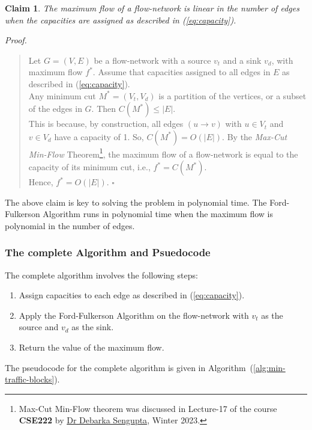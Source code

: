 \documentclass[12pt]{report}
\newtheorem{claim}{Claim}
\begin{document}
    \begin{claim}
        \label{claim:polynomial}
        The maximum flow of a flow-network is linear in the number of edges when
        the capacities are assigned as described in (\ref{eq:capacity}).
    \end{claim}
    \textit{Proof.}
    \begin{quote}
        Let $G = (V, E)$ be a flow-network with a source $v_{t}$ and a sink $v_{d}$, with maximum flow $f^{*}$.
        Assume that capacities assigned to all edges in $E$ as described in (\ref{eq:capacity}).
        \vspace*{10pt} \\
        Any minimum cut $M^{*} = (V_{t}, V_{d})$ is a partition of the vertices, or a subset of the edges in $G$. Then $C(M^{*}) \leq |E|$. \\
        This is because, by construction, all edges $(u \to v)$ with $u \in V_{t}$ and $v \in V_{d}$ have a capacity of 1.
        So, $C(M^{*}) = O(|E|)$. By the \textit{Max-Cut Min-Flow} Theorem\footnote{
            Max-Cut Min-Flow theorem was discussed in Lecture-17 of the course \textbf{CSE222} by \href{mailto:debarka@iiitd.ac.in}{Dr Debarka Sengupta},
            Winter 2023.
        }, the maximum flow of a flow-network is equal to the capacity of its minimum cut, i.e., $f^{*} = C(M^{*})$.
        \vspace*{10pt} \\
        Hence, $f^{*} = O(|E|)$. \hfill $\square$
    \end{quote}
    \vspace*{10pt}
    The above claim is key to solving the problem in polynomial time.
    The Ford-Fulkerson Algorithm runs in polynomial time when the maximum flow is polynomial in the number of edges.

    \subsubsection*{The complete Algorithm and Psuedocode}
    The complete algorithm involves the following steps:
    \begin{enumerate}
        \item Assign capacities to each edge as described in (\ref{eq:capacity}).
        \item Apply the Ford-Fulkerson Algorithm on the flow-network with $v_{t}$ as the source and $v_{d}$ as the sink.
        \item Return the value of the maximum flow.
    \end{enumerate}
    The pseudocode for the complete algorithm is given in Algorithm~(\ref{alg:min-traffic-blocks}).
    \vfill
    \pagebreak
\end{document}
